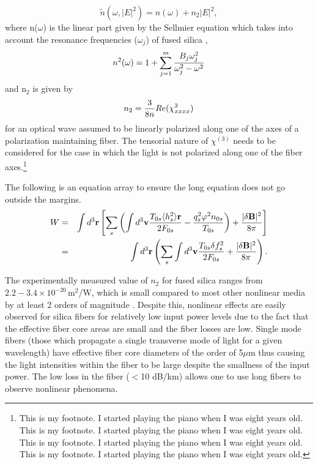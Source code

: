 \begin{equation}
\tilde{n}(\omega,|E|^2) = n(\omega)+n_2|E|^2 ,
\end{equation}
where n($\omega$) is the linear part given by the Sellmier
equation which
takes into account the resonance frequencies ($\omega_j$) of fused
silica \cite{Agrawal1,Marcuse},
\begin{equation}
n^2(\omega) = 1 + \sum_{j=1}^m {B_j\omega^2_j \over \omega^2_j - \omega^2}
\end{equation}
and n$_2$ is given by
\begin{equation}
n_2 = {3 \over 8n}Re(\chi_{xxxx}^3)
\end{equation}
for an optical wave assumed to be linearly polarized along one of the
axes of a polarization maintaining fiber. The tensorial nature of $\chi^{(3)}$ needs to be
considered for the case in which the light is not polarized along one of
the fiber axes.\footnote{This is my footnote.  I started playing the piano when I was eight years old.  This is my footnote.  I started playing the piano when I was eight years old.  This is my footnote.  I started playing the piano when I was eight years old.  This is my footnote.  I started playing the piano when I was eight years old.}

The following is an equation array to ensure the long equation does not go outside the margins.
\begin{eqnarray}
W & = & \int d^3{\bf r} \left[ \sum_s \left( \int d^3{\bf v} {T_{0s} \langle h^2_s \rangle {\bf r} \over 2F_{0s}} - {q^2_s\varphi^2 n_{0s} \over T_{0s}} \right) + {|\delta {\bf B}|^2 \over 8 \pi} \right] \nonumber \\
& = & \int d^3{\bf r} \left( \sum_s \int d^3{\bf v} {T_{0s}\delta f^2_s \over 2F_{0s}} + {|\delta {\bf B}|^2 \over 8\pi} \right) .
\end{eqnarray}

The experimentally measured value of $n_{2}$ for fused silica ranges from $2.2 - 3.4 \times
10^{-20}$\,m$^2$/W, which is small compared to most other nonlinear media by
at least 2 orders of magnitude \cite{Agrawal1}. Despite this, nonlinear effects are
easily observed for silica fibers for relatively low input power levels due
to the fact that the effective fiber core areas are small and the fiber losses are low.
Single mode fibers (those which propagate a single transverse mode of light for a given
wavelength) have effective fiber core diameters of the order of 5$\mu$m thus causing
the light intensities within the fiber to be large despite the smallness of the input
power. The low loss in the fiber ($<$10 dB/km) allows one to use long fibers to observe
nonlinear phenomena.

